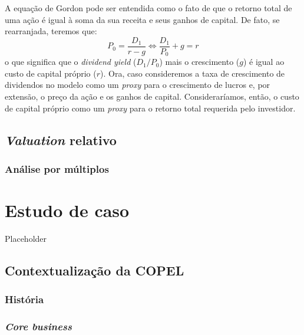 \documentclass[grad,numbers]{coppe}
\begin{document}
  A equação de Gordon pode ser entendida como o fato de que o retorno total de uma ação é igual à soma da sua receita e seus ganhos de capital. De fato, se rearranjada, teremos que:
  \[
  P_0 = \frac{D_1}{r-g} \iff \frac{D_1}{P_0} + g = r
  \]
  o que significa que o \emph{dividend yield} (\(D_1/P_0\)) mais o crescimento (\(g\)) é igual ao custo de capital próprio (\(r\)). Ora, caso consideremos a taxa de crescimento de dividendos no modelo como um \emph{proxy} para o crescimento de lucros e, por extensão, o preço da ação e os ganhos de capital. Consideraríamos, então, o custo de capital próprio como um \emph{proxy} para o retorno total requerida pelo investidor.

  \hypertarget{valuation-relativo}{%
  \section{\texorpdfstring{\emph{Valuation} relativo}{Valuation relativo}}\label{valuation-relativo}}

  \hypertarget{anuxe1lise-por-muxfaltiplos}{%
  \subsection{Análise por múltiplos}\label{anuxe1lise-por-muxfaltiplos}}

  \hypertarget{estudo-de-caso}{%
  \chapter{Estudo de caso}\label{estudo-de-caso}}

  Placeholder

  \hypertarget{contextualizauxe7uxe3o-da-copel}{%
  \section{Contextualização da COPEL}\label{contextualizauxe7uxe3o-da-copel}}

  \hypertarget{histuxf3ria}{%
  \subsection{História}\label{histuxf3ria}}

  \hypertarget{core-business}{%
  \subsection{\texorpdfstring{\emph{Core business}}{Core business}}\label{core-business}}
\end{document}
